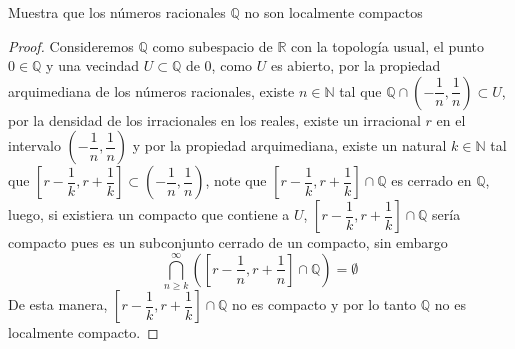 
\item Muestra que los números racionales $\mathbb{Q}$ no son localmente compactos
\begin{proof}   
Consideremos $\mathbb{Q}$ como subespacio de $\mathbb{R}$ con la topología usual, el punto $0\in \mathbb{Q}$ y una vecindad $U \subset \mathbb{Q}$ de 0, como $U$ es abierto, por la propiedad arquimediana de los números racionales, existe $n \in \mathbb{N}$ tal que $ \mathbb{Q} \cap \left(-\dfrac{1}{n},\dfrac{1}{n}\right) \subset U$, por la densidad de los irracionales en los reales, existe un irracional $r$ en el intervalo $\left(-\dfrac{1}{n},\dfrac{1}{n}\right)$ y por la propiedad arquimediana, existe un natural $k \in \mathbb{N}$ tal que $\left[r-\dfrac{1}{k},r+\dfrac{1}{k}\right] \subset \left(-\dfrac{1}{n},\dfrac{1}{n}\right)$, note que $\left[r-\dfrac{1}{k},r+\dfrac{1}{k}\right]\cap \mathbb{Q}$ es cerrado en $\mathbb{Q}$, luego, si existiera un compacto que contiene a $U$, $\left[r-\dfrac{1}{k},r+\dfrac{1}{k}\right]\cap \mathbb{Q}$ sería compacto pues es un subconjunto cerrado de un compacto, sin embargo
\[
    \bigcap_{n \geq k}^{\infty}\left(\left[r-\frac{1}{n},r+\frac{1}{n}\right]\cap \mathbb{Q}\right) = \emptyset
\]
De esta manera, $\left[r-\dfrac{1}{k},r+\dfrac{1}{k}\right]\cap \mathbb{Q}$ no es compacto y por lo tanto $\mathbb{Q}$ no es localmente compacto.
            
\end{proof}